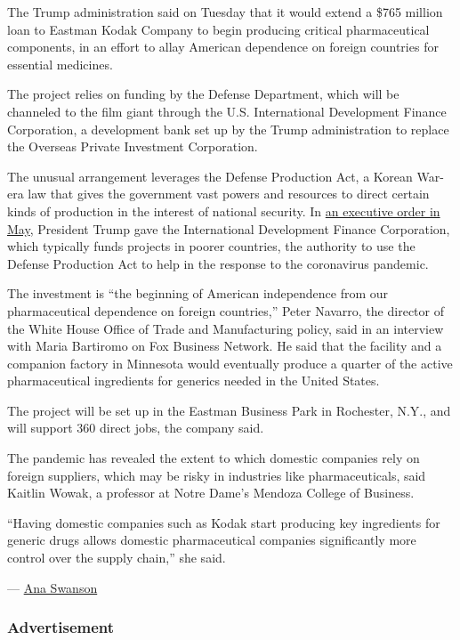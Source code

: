 The Trump administration said on Tuesday that it would extend a \$765
million loan to Eastman Kodak Company to begin producing critical
pharmaceutical components, in an effort to allay American dependence on
foreign countries for essential medicines.

The project relies on funding by the Defense Department, which will be
channeled to the film giant through the U.S. International Development
Finance Corporation, a development bank set up by the Trump
administration to replace the Overseas Private Investment Corporation.

The unusual arrangement leverages the Defense Production Act, a Korean
War-era law that gives the government vast powers and resources to
direct certain kinds of production in the interest of national security.
In
\href{https://slack-redir.net/link?url=https\%3A\%2F\%2Fwww.whitehouse.gov\%2Fpresidential-actions\%2Feo-delegating-authority-dpa-ceo-u-s-international-development-finance-corporation-respond-covid-19-outbreak\%2F}{an
executive order in May}, President Trump gave the International
Development Finance Corporation, which typically funds projects in
poorer countries, the authority to use the Defense Production Act to
help in the response to the coronavirus pandemic.

The investment is ``the beginning of American independence from our
pharmaceutical dependence on foreign countries,'' Peter Navarro, the
director of the White House Office of Trade and Manufacturing policy,
said in an interview with Maria Bartiromo on Fox Business Network. He
said that the facility and a companion factory in Minnesota would
eventually produce a quarter of the active pharmaceutical ingredients
for generics needed in the United States.

The project will be set up in the Eastman Business Park in Rochester,
N.Y., and will support 360 direct jobs, the company said.

The pandemic has revealed the extent to which domestic companies rely on
foreign suppliers, which may be risky in industries like
pharmaceuticals, said Kaitlin Wowak, a professor at Notre Dame's Mendoza
College of Business.

``Having domestic companies such as Kodak start producing key
ingredients for generic drugs allows domestic pharmaceutical companies
significantly more control over the supply chain,'' she said.

--- \href{https://www.nytimes.com/by/ana-swanson}{Ana Swanson}

\hypertarget{advertisement}{%
\subsubsection{Advertisement}\label{advertisement}}

